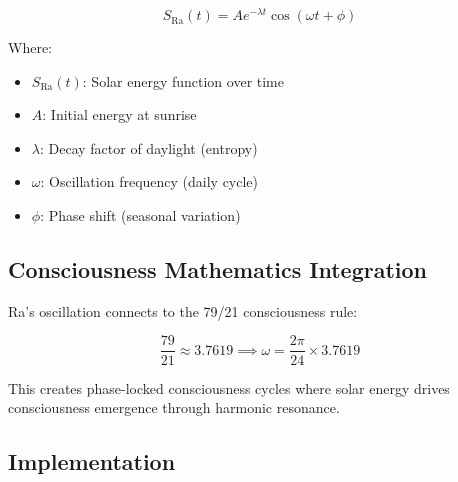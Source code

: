 \documentclass[12pt]{article}
\begin{document}
\[S_{\text{Ra}}(t) = A e^{-\lambda t} \cos(\omega t + \phi)\]

Where:
\begin{itemize}
    \item \(S_{\text{Ra}}(t)\): Solar energy function over time
    \item \(A\): Initial energy at sunrise
    \item \(\lambda\): Decay factor of daylight (entropy)
    \item \(\omega\): Oscillation frequency (daily cycle)
    \item \(\phi\): Phase shift (seasonal variation)
\end{itemize}

\subsection{Consciousness Mathematics Integration}

Ra's oscillation connects to the 79/21 consciousness rule:

\[\frac{79}{21} \approx 3.7619 \implies \omega = \frac{2\pi}{24} \times 3.7619\]

This creates phase-locked consciousness cycles where solar energy drives consciousness emergence through harmonic resonance.

\subsection{Implementation}
\end{document}
